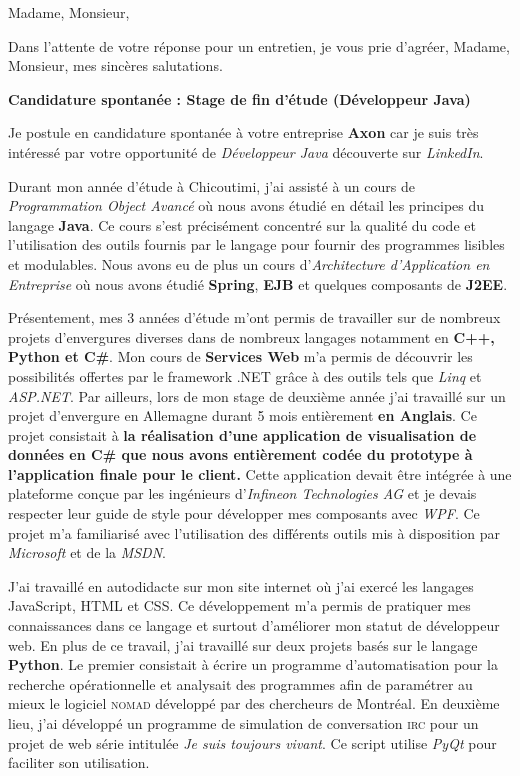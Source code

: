 \date{\today}
\opening{Madame, Monsieur,}
\closing{Dans l'attente de votre réponse pour un entretien, je vous prie d'agréer, Madame, Monsieur, mes sincères salutations.}

\makelettertitle

\textbf{Candidature spontanée : Stage de fin d'étude (Développeur Java)}

\introduction{}
Je postule en candidature spontanée à votre entreprise \textbf{Axon} car je suis très intéressé par votre opportunité de \textit{Développeur Java} découverte sur \textit{LinkedIn}.

Durant mon année d'étude à Chicoutimi, j'ai assisté à un cours de \textit{Programmation Object Avancé} où nous avons étudié en détail les principes du langage \textbf{Java}. Ce cours s'est précisément concentré sur la qualité du code et l'utilisation des outils fournis par le langage pour fournir des programmes lisibles et modulables. Nous avons eu de plus un cours d'\textit{Architecture d'Application en Entreprise} où nous avons étudié \textbf{Spring}, \textbf{EJB} et quelques composants de \textbf{J2EE}.

Présentement, mes 3 années d'étude m'ont permis de travailler sur de nombreux projets d'envergures diverses dans de nombreux langages notamment en \textbf{C++, Python et C\#}. Mon cours de \textbf{Services Web} m'a permis de découvrir les possibilités offertes par le framework .NET grâce à des outils tels que \textit{Linq} et \textit{ASP.NET}. Par ailleurs, lors de mon stage de deuxième année j'ai travaillé sur un projet d'envergure en Allemagne durant 5 mois entièrement \textbf{en Anglais}. Ce projet consistait à \textbf{la réalisation d'une application de visualisation de données en C\# que nous avons entièrement codée du prototype à l'application finale pour le client.} Cette application devait être intégrée à une plateforme conçue par les ingénieurs d'\textit{Infineon Technologies AG} et je devais respecter leur guide de style pour développer mes composants avec \textit{WPF}. Ce projet m'a familiarisé avec l'utilisation des différents outils mis à disposition par \textit{Microsoft} et de la \textit{MSDN}.

J'ai travaillé en autodidacte sur mon site internet où j'ai exercé les langages JavaScript, HTML et CSS. Ce développement m'a permis de pratiquer mes connaissances dans ce langage et surtout d'améliorer mon statut de développeur web. En plus de ce travail, j'ai travaillé sur deux projets basés sur le langage \textbf{Python}. Le premier consistait à écrire un programme d'automatisation pour la recherche opérationnelle et analysait des programmes afin de paramétrer au mieux le logiciel \textsc{nomad} développé par des chercheurs de Montréal. En deuxième lieu, j'ai développé un programme de simulation de conversation \textsc{irc} pour un projet de web série intitulée \textit{Je suis toujours vivant}. Ce script utilise \textit{PyQt} pour faciliter son utilisation.

